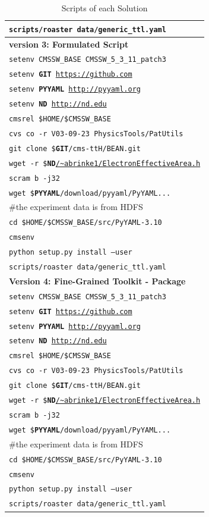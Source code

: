 \documentclass{sig-alternate}
\begin{document}
\begin{table}
\begin{tabular}{|l|}
        {\tt scripts/roaster data/generic\_ttl.yaml} \\ 
        \hline
        {\bf version 3: Formulated Script} \\ \hline
        {\tt setenv CMSSW\_BASE CMSSW\_5\_3\_11\_patch3} \\
        {\tt setenv {\bf GIT} \url{https://github.com}} \\
        {\tt setenv {\bf PYYAML} \url{http://pyyaml.org}} \\
        {\tt setenv {\bf ND} \url{http://nd.edu}} \\
        {\tt cmsrel \$HOME/\$CMSSW\_BASE} \\
        {\tt cvs co -r V03-09-23 PhysicsTools/PatUtils} \\
        {\tt git clone \${\bf GIT}/cms-ttH/BEAN.git} \\
        {\tt wget -r \${\bf ND}\url{/~abrinke1/ElectronEffectiveArea.h}} \\
        {\tt scram b -j32} \\
        {\tt wget \${\bf PYYAML}/download/pyyaml/PyYAML...}\\
        \#the experiment data is from HDFS \\
        {\tt cd \$HOME/\$CMSSW\_BASE/src/PyYAML-3.10}\\
        {\tt cmsenv}\\
        {\tt python setup.py install --user} \\
        {\tt scripts/roaster data/generic\_ttl.yaml} \\ 
        \hline
       {\bf Version 4: Fine-Grained Toolkit - Package}\\ \hline
        {\tt setenv CMSSW\_BASE CMSSW\_5\_3\_11\_patch3} \\
        {\tt setenv {\bf GIT} \url{https://github.com}} \\
        {\tt setenv {\bf PYYAML} \url{http://pyyaml.org}} \\
        {\tt setenv {\bf ND} \url{http://nd.edu}} \\
        {\tt cmsrel \$HOME/\$CMSSW\_BASE} \\
        {\tt cvs co -r V03-09-23 PhysicsTools/PatUtils} \\
        {\tt git clone \${\bf GIT}/cms-ttH/BEAN.git} \\
        {\tt wget -r \${\bf ND}\url{/~abrinke1/ElectronEffectiveArea.h}} \\
        {\tt scram b -j32} \\
        {\tt wget \${\bf PYYAML}/download/pyyaml/PyYAML...}\\
        \#the experiment data is from HDFS \\
        {\tt cd \$HOME/\$CMSSW\_BASE/src/PyYAML-3.10}\\
        {\tt cmsenv}\\
        {\tt python setup.py install --user} \\
        {\tt scripts/roaster data/generic\_ttl.yaml} \\ 
        \hline
    \end{tabular}
    \caption{Scripts of each Solution}
    \label{table:scripts}
\end{table}
\end{document}
